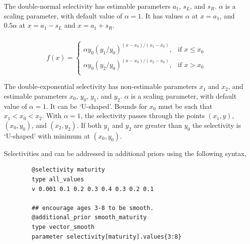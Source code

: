 The double-normal selectivity has estimable parameters $a_1$, $s_L$, and $s_R$. $\alpha$ is a scaling parameter, with default value of $\alpha = 1$. It has values $\alpha$ at $x=a_1$, and $0.5 \alpha$ at $x=a_1-s_L$ and $x=a_1+s_R$. 

\subsubsection[Double-exponential]{}

\begin{equation} 
f(x)=\begin{cases}
	  \alpha y_0(y_1 / y_0)^{(x-x_0)/(x_1-x_0)}, & \text{if $x \le x_0$} \\
	  \alpha y_0(y_2 / y_0)^{(x-x_0)/(x_2-x_0)}, & \text{if $x > x_0$} \\
  \end{cases}
\end{equation}

The double-exponential selectivity has non-estimable parameters $x_1$ and $x_2$, and estimable parameters $x_0$, $y_0$, $y_1$, and $y_2$.  $\alpha$ is a scaling parameter, with default value of $\alpha = 1$. It can be `U-shaped'. Bounds for $x_0$ must be such that $x_1 < x_0 < x_2$. With $\alpha=1$, the selectivity passes through the points $(x_1, y)$, $(x_0, y_0)$, and $(x_2, y_2)$. If both $y_1$ and $y_2$ are greater than $y_0$ the selectivity is `U-shaped' with minimum at $(x_0, y_0)$.

%
%


Selectivities  and  can be addressed in additional priors using the following syntax,

{\small{\begin{verbatim}
		@selectivity maturity
		type all_values
		v 0.001 0.1 0.2 0.3 0.4 0.3 0.2 0.1
		
		## encourage ages 3-8 to be smooth.
		@additional_prior smooth_maturity
		type vector_smooth
		parameter selectivity[maturity].values{3:8}
		
		\end{verbatim}}}
	
